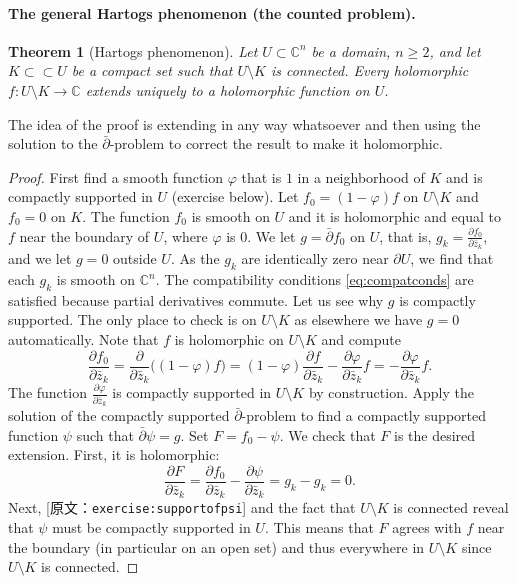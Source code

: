 \documentclass[UTF8,11pt]{ctexart}
\newtheorem*{thm}{Theorem}
\theoremstyle{definition}
\newcommand{\C}{\mathbb C}
\newcommand{\sourceref}[1]{\textnormal{[原文：\nolinkurl{#1}]}}
\newcommand{\exerciseref}[1]{\sourceref{#1}}
\begin{document}
\paragraph{The general Hartogs phenomenon (the counted problem).}
\begin{thm}[Hartogs phenomenon]
Let $U\subset\C^n$ be a domain, $n\geq2$, and let $K\subset\subset U$ be a compact set such that $U\setminus K$ is connected. Every holomorphic $f:U\setminus K\to\C$ extends uniquely to a holomorphic function on $U$.
\end{thm}
The idea of the proof is extending in any way whatsoever and then using the solution to the $\bar\partial$-problem to correct the result to make it holomorphic.
\begin{proof}
First find a smooth function $\varphi$ that is $1$ in a neighborhood of $K$ and is compactly supported in $U$ (exercise below). Let $f_0=(1-\varphi)f$ on $U\setminus K$ and $f_0=0$ on $K$. The function $f_0$ is smooth on $U$ and it is holomorphic and equal to $f$ near the boundary of $U$, where $\varphi$ is $0$. We let $g=\bar\partial f_0$ on $U$, that is, $g_k=\frac{\partial f_0}{\partial\bar z_k}$, and we let $g=0$ outside $U$. As the $g_k$ are identically zero near $\partial U$, we find that each $g_k$ is smooth on $\C^n$. The compatibility conditions \eqref{eq:compatconds} are satisfied because partial derivatives commute. Let us see why $g$ is compactly supported. The only place to check is on $U\setminus K$ as elsewhere we have $g=0$ automatically. Note that $f$ is holomorphic on $U\setminus K$ and compute
\[
\frac{\partial f_0}{\partial\bar z_k}
=\frac{\partial}{\partial\bar z_k}\bigl((1-\varphi)f\bigr)
=(1-\varphi)\frac{\partial f}{\partial\bar z_k}-\frac{\partial\varphi}{\partial\bar z_k}f
=-\frac{\partial\varphi}{\partial\bar z_k}f.
\]
The function $\frac{\partial\varphi}{\partial\bar z_k}$ is compactly supported in $U\setminus K$ by construction. Apply the solution of the compactly supported $\bar\partial$-problem to find a compactly supported function $\psi$ such that $\bar\partial\psi=g$. Set $F=f_0-\psi$. We check that $F$ is the desired extension. First, it is holomorphic:
\[
\frac{\partial F}{\partial\bar z_k}=\frac{\partial f_0}{\partial\bar z_k}-\frac{\partial\psi}{\partial\bar z_k}=g_k-g_k=0.
\]
Next, \exerciseref{exercise:supportofpsi} and the fact that $U\setminus K$ is connected reveal that $\psi$ must be compactly supported in $U$. This means that $F$ agrees with $f$ near the boundary (in particular on an open set) and thus everywhere in $U\setminus K$ since $U\setminus K$ is connected.
\end{proof}
\end{document}
